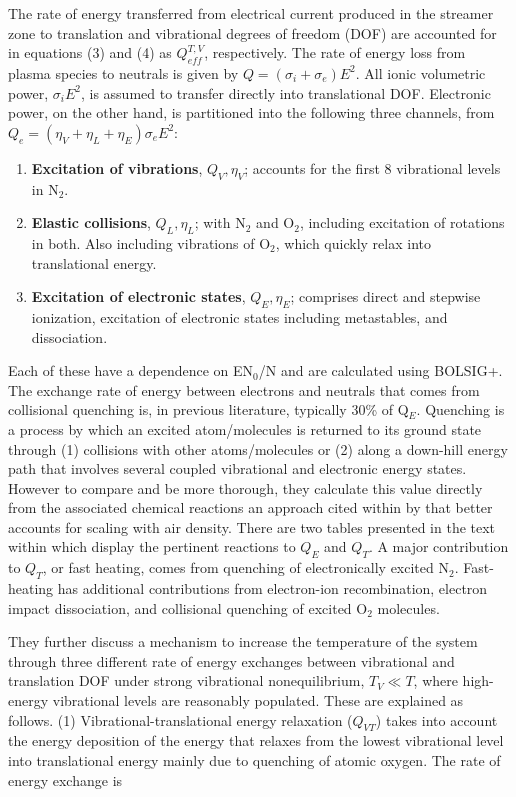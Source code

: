 \documentclass[]{article}
\begin{document}
	The rate of energy transferred from electrical current produced in the streamer zone to translation and vibrational degrees of freedom (DOF) are accounted for in equations (3) and (4) as $Q_{eff}^{T,V}$, respectively. The rate of energy loss from plasma species to neutrals is given by $Q = (\sigma_i + \sigma_e) E^2$. All ionic volumetric power, $\sigma_i E^2$, is assumed to transfer directly into translational DOF. Electronic power, on the other hand, is partitioned into the following three channels, from $Q_e = (\eta_V + \eta_L + \eta_E)\sigma_eE^2$:
	\begin{enumerate}
		\item \textbf{Excitation of vibrations}, $Q_V,\eta_V$; accounts for the first 8 vibrational levels in N$_2$.
		\item \textbf{Elastic collisions}, $Q_L,\eta_L$; with N$_2$ and O$_2$, including excitation of rotations in both. Also including vibrations of O$_2$, which quickly relax into translational energy.
		\item \textbf{Excitation of electronic states}, $Q_E,\eta_E$; comprises direct and stepwise ionization, excitation of electronic states including metastables, and dissociation. 
	\end{enumerate}
	Each of these have a dependence on EN$_0$/N and are calculated using BOLSIG+. The exchange rate of energy between electrons and neutrals that comes from collisional quenching is, in previous literature, typically 30\% of Q$_E$. Quenching is a process by which an excited atom/molecules is returned to its ground state through (1) collisions with other atoms/molecules or (2) along a down-hill energy path that involves several coupled vibrational and electronic energy states. However to compare and be more thorough, they calculate this value directly from the associated chemical reactions an approach cited within by \citet{Popov:2001} that better accounts for scaling with air density. There are two tables presented in the text within which display the pertinent reactions to $Q_E$ and $Q_T$. A major contribution to $Q_T$, or fast heating, comes from quenching of electronically excited N$_2$. Fast-heating has additional contributions from electron-ion recombination, electron impact dissociation, and collisional quenching of excited O$_2$ molecules.
	
	They further discuss a mechanism to increase the temperature of the system through three different rate of energy exchanges between vibrational and translation DOF under strong vibrational nonequilibrium, $T_V \ll T$, where high-energy vibrational levels are reasonably populated. These are explained as follows. (1) Vibrational-translational energy relaxation ($Q_{VT}$) takes into account the energy deposition of the energy that relaxes from the lowest vibrational level into translational energy mainly due to quenching of atomic oxygen. The rate of energy exchange is
	
\end{document}
